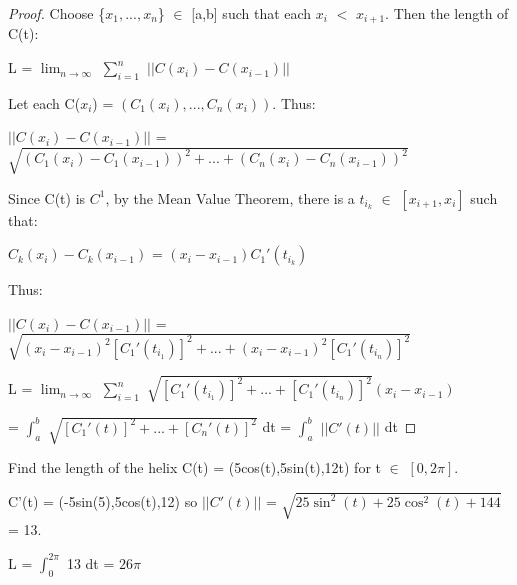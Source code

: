     \begin{proof}
        Choose \{$x_1,...,x_n$\} $\in$ [a,b] such that each $x_i$ $<$ $x_{i+1}$.
        Then the length of C(t):

        \hspace{0.5cm}
        L = $\lim_{n \rightarrow \infty}$ $\sum_{i=1}^n$ $||C(x_i) - C(x_{i-1})||$

        Let each C($x_i$) = $(C_1(x_i),...,C_n(x_i))$. Thus:
        
        \hspace{0.5cm}
        $||C(x_i) - C(x_{i-1})||$
        = $\sqrt{(C_1(x_i)-C_1(x_{i-1}))^2 + ... + (C_n(x_i)-C_n(x_{i-1}))^2}$

        Since C(t) is $C^1$, by the Mean Value Theorem,
        there is a $t_{i_k}$ $\in$ $[x_{i+1},x_i]$ such that:

        \hspace{0.5cm}
        $C_k(x_i) - C_k(x_{i-1})$
        = $(x_i - x_{i-1})C_1'(t_{i_k})$

        Thus:

        \hspace{0.5cm}
        $||C(x_i) - C(x_{i-1})||$
        = $\sqrt{(x_i-x_{i-1})^2[C_1'(t_{i_1})]^2
                + ... + (x_i-x_{i-1})^2[C_1'(t_{i_n})]^2}$

        \hspace{0.5cm}
        L = $\lim_{n \rightarrow \infty}$ $\sum_{i=1}^n$
            $\sqrt{[C_1'(t_{i_1})]^2 + ... + [C_1'(t_{i_n})]^2}(x_i - x_{i-1})$
        
        \hspace{0.9cm}
        = $\int_a^b$ $\sqrt{[C_1'(t)]^2 + ... + [C_n'(t)]^2}$ dt
        = $\int_a^b$ $||C'(t)||$ dt 
    \end{proof}

    \vspace{0.5cm}



    \begin{example}
        Find the length of the helix C(t) = (5cos(t),5sin(t),12t)
        for t $\in$ $[0,2\pi]$.
    \end{example}

    \begin{tbox}
        C'(t) = (-5sin(5),5cos(t),12)
        so $||C'(t)||$ = $\sqrt{25\sin^2(t) + 25\cos^2(t) + 144}$ = 13.

        L = $\int_0^{2\pi}$ 13 dt = $26\pi$
    \end{tbox}

